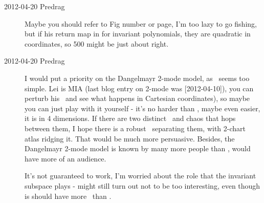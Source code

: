 \begin{description}
\item[2012-04-20 Predrag] Maybe you should refer to Fig number or page,
I'm too lazy to go fishing, but if his return map in for invariant
polynomials, they are quadratic in coordinates, so 500 might be just
about right.

\item[2012-04-20 Predrag] I would put a priority on the Dangelmayr 2-mode
model, as \cLe\ seems too simple. Lei is MIA (last blog entry on 2-mode
was [2012-04-10]), you can perturb his \reqva\ and see what happens in
Cartesian coordinates), so maybe you can just play with it yourself -
it's no harder than \cLe, maybe even easier, it is in 4 dimensions. If
there are two distinct \reqva\ and chaos that hops between them, I hope
there is a robust \chartBord\ separating them, with 2-chart atlas ridging
it. That would be much more persuasive. Besides, the Dangelmayr 2-mode
model is known by many more people than \cLe, would have more of an
audience.

It's not guaranteed to work, I'm worried about the role that the
invariant subspace plays - might still turn out not to be too
interesting, even though is should have more \reqva\ than \cLe.

\end{description}
